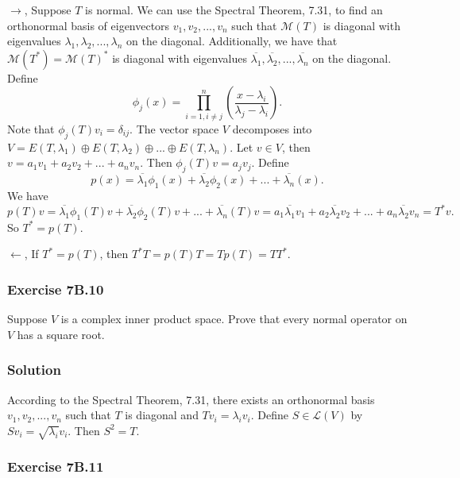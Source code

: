 $\rightarrow$, Suppose $T$ is normal.
We can use the Spectral Theorem, 7.31, to find an orthonormal basis of eigenvectors $v_1, v_2, ..., v_n$ such that $\mathcal{M}(T)$ is diagonal with eigenvalues $\lambda_1, \lambda_2, ..., \lambda_n$ on the diagonal.
Additionally, we have that $\mathcal{M}(T^*) = \mathcal{M}(T)^*$ is diagonal with eigenvalues $\overline{\lambda_1}, \overline{\lambda_2}, ..., \overline{\lambda_n}$ on the diagonal.
Define
\begin{equation*}
    \phi_j(x) = \prod_{i = 1, i \neq j}^{n} \left( \frac{x - \lambda_i}{\lambda_j - \lambda_i} \right).
\end{equation*}
Note that $\phi_j(T)v_i = \delta_{ij}$.
The vector space $V$ decomposes into $V = E(T, \lambda_1) \oplus E(T, \lambda_2) \oplus ... \oplus E(T, \lambda_n)$.
Let $v \in V$, then $v = a_1 v_1 + a_2 v_2 + ... + a_n v_n$.
Then $\phi_j(T)v = a_j v_j$.
Define
\begin{equation*}
    p(x) = \overline{\lambda_1} \phi_1(x) + \overline{\lambda_2} \phi_2(x) + ... + \overline{\lambda_n}(x).
\end{equation*}
We have
\begin{equation*}
    p(T)v = \overline{\lambda_1} \phi_1(T)v + \overline{\lambda_2} \phi_2(T)v + ... + \overline{\lambda_n}(T)v
        = a_1 \overline{\lambda_1} v_1 + a_2 \overline{\lambda_2} v_2 + ... + a_n \overline{\lambda_2} v_n
        = T^* v.
\end{equation*}
So $T^* = p(T)$.

$\leftarrow$, If $T^* = p(T)$, then $T^* T = p(T)T = Tp(T) = TT^*$.


\subsubsection*{Exercise 7B.10}

Suppose $V$ is a complex inner product space.
Prove that every normal operator on $V$ has a square root.

\subsubsection*{Solution}

According to the Spectral Theorem, 7.31, there exists an orthonormal basis $v_1, v_2, ..., v_n$ such that $T$ is diagonal and $Tv_i = \lambda_i v_i$.
Define $S \in \mathcal{L}(V)$ by $Sv_i = \sqrt{\lambda_i} v_i$.
Then $S^2 = T$.


\subsubsection*{Exercise 7B.11}

